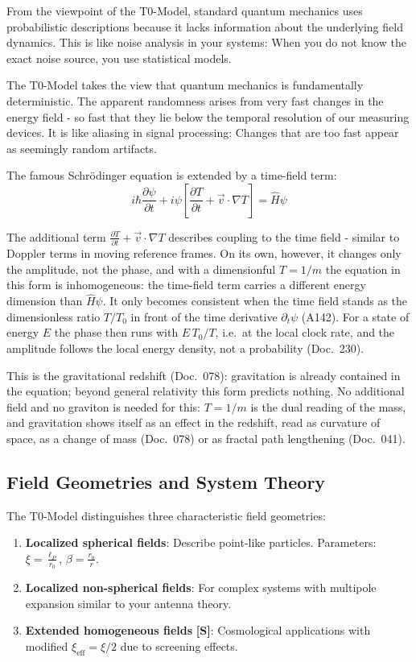 From the viewpoint of the T0-Model, standard quantum mechanics uses probabilistic descriptions because it lacks information about the underlying field dynamics. This is like noise analysis in your systems: When you do not know the exact noise source, you use statistical models.

The T0-Model takes the view that quantum mechanics is fundamentally deterministic. The apparent randomness arises from very fast changes in the energy field - so fast that they lie below the temporal resolution of our measuring devices. It is like aliasing in signal processing: Changes that are too fast appear as seemingly random artifacts.

The famous Schrödinger equation is extended by a time-field term:
$$i\hbar\frac{\partial\psi}{\partial t} + i\psi\left[\frac{\partial T}{\partial t} + \vec{v} \cdot \nabla T\right] = \hat{H}\psi$$

The additional term $\frac{\partial T}{\partial t} + \vec{v} \cdot \nabla T$ describes coupling to the time field - similar to Doppler terms in moving reference frames. On its own, however, it changes only the amplitude, not the phase, and with a dimensionful $T=1/m$ the equation in this form is inhomogeneous: the time-field term carries a different energy dimension than $\hat H\psi$. It only becomes consistent when the time field stands as the dimensionless ratio $T/T_0$ in front of the time derivative $\partial_t\psi$ (A142). For a state of energy $E$ the phase then runs with $E\,T_0/T$, i.e.\ at the local clock rate, and the amplitude follows the local energy density, not a probability (Doc.~230).

This is the gravitational redshift (Doc.~078): gravitation is already contained in the equation; beyond general relativity this form predicts nothing. No additional field and no graviton is needed for this: $T=1/m$ is the dual reading of the mass, and gravitation shows itself as an effect in the redshift, read as curvature of space, as a change of mass (Doc.~078) or as fractal path lengthening (Doc.~041).
\subsection{Field Geometries and System Theory}

The T0-Model distinguishes three characteristic field geometries:

\begin{enumerate}
	\item \textbf{Localized spherical fields}: Describe point-like particles. Parameters: $\xi = \frac{\ell_P}{r_0}$, $\beta = \frac{r_0}{r}$.
	\item \textbf{Localized non-spherical fields}: For complex systems with multipole expansion similar to your antenna theory.
	\item \textbf{Extended homogeneous fields} \textbf{[S]}: Cosmological applications with modified $\xi_{\text{eff}} = \xi/2$ due to screening effects.
\end{enumerate}

